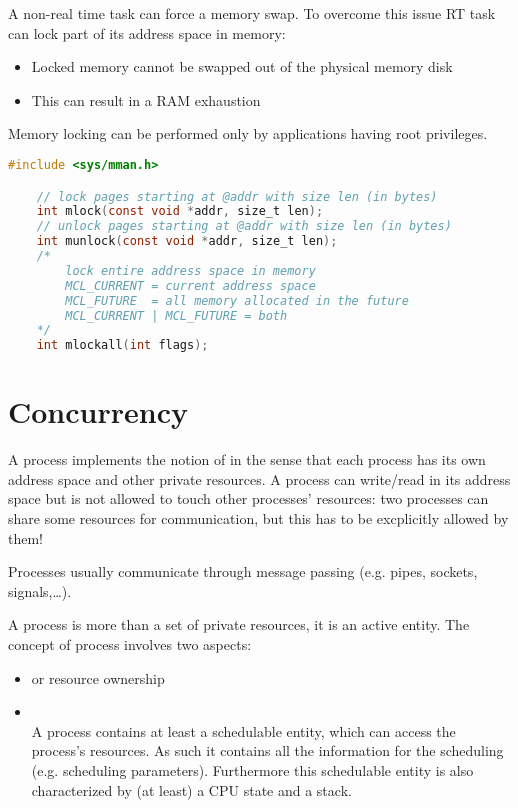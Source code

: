 A non-real time task can force a memory swap. To overcome this issue RT task can lock part of its address space in memory:
\begin{itemize}
    \item Locked memory cannot be swapped out of the physical memory disk
    \item This can result in a RAM exhaustion
\end{itemize}
Memory locking can be performed only by applications having root privileges.

\begin{lstlisting}[language=C]
    #include <sys/mman.h>

    // lock pages starting at @addr with size len (in bytes)
    int mlock(const void *addr, size_t len);
    // unlock pages starting at @addr with size len (in bytes)
    int munlock(const void *addr, size_t len);
    /*
        lock entire address space in memory
        MCL_CURRENT = current address space
        MCL_FUTURE  = all memory allocated in the future
        MCL_CURRENT | MCL_FUTURE = both
    */
    int mlockall(int flags);
\end{lstlisting}


\section{Concurrency}
A process implements the notion of  in the sense that each process has its own address space and other private resources. A process can write/read in its address space but is not allowed to touch other processes' resources: two processes can share some resources for communication, but this has to be excplicitly allowed by them!

Processes usually communicate through message passing (e.g. pipes, sockets, signals,\dots).

A process is more than a set of private resources, it is an active entity.
The concept of process involves two aspects:
\begin{itemize}
    \item {} or resource ownership
    \item {}\\
    A process contains at least a schedulable entity, which can access the process's resources. As such it contains all the information for the scheduling (e.g. scheduling parameters).
    Furthermore this schedulable entity is also characterized by (at least) a CPU state and a stack.
\end{itemize}


